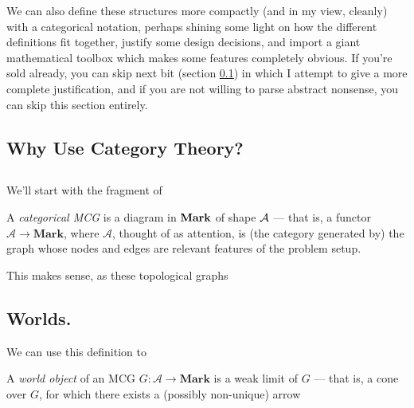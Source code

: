 \documentclass{article}
\begin{document}
	We can also define these structures more compactly (and in my view, cleanly) with a categorical notation, perhaps shining some light on how the different definitions fit together, justify some design decisions, and import a giant mathematical toolbox which makes some features completely obvious. If you're sold already, you can skip next bit (section \ref{sec:cat-defense}) in which I attempt to give a more complete justification, and if you are not willing to parse abstract nonsense, you can skip this section entirely.
	
	\subsection{Why Use Category Theory?}\label{sec:cat-defense}
	

	\subsection{}
	We'll start with the fragment of 
	
	\begin{defn}
		A \emph{categorical MCG} is a diagram in $\bf Mark$ of shape $\cal A$ --- that is, a functor $\mathcal A \to \mathbf{Mark}$, where $\mathcal A$, thought of as attention, is (the category generated by) the graph whose nodes and edges are relevant features of the problem setup.
	\end{defn}
	
	This makes sense, as these topological graphs
	\subsection{Worlds.} \label{sec:cat-worlds}
	
	We can use this definition to 
	
	\begin{defn}
		A \emph{world object} of an MCG $G : \mathcal A \to \mathbf{Mark}$ is a weak limit of $G$ --- that is, a cone over $G$, for which there exists a (possibly non-unique) arrow 
	\end{defn}
\end{document}
